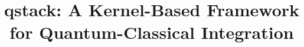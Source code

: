 \documentclass[acmsmall,review,screen]{acmart}
\title{qstack: A Kernel-Based Framework for Quantum-Classical Integration}
\renewcommand{\`}[1]{\texttt{#1}}
\begin{document}
\flushbottom

\maketitle














\end{document}
